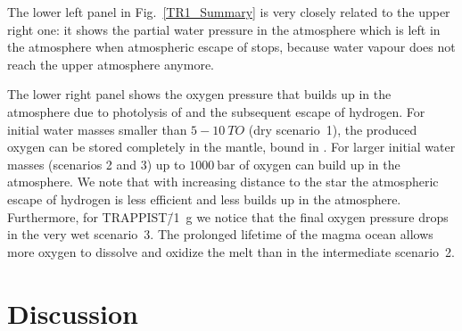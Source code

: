 \documentclass[paper=letterpaper,fontsize=12pt,oneside,twocolumn]{article}
\begin{document}
The lower left panel in  Fig.~\ref{TR1_Summary} is very closely related to the upper right one: it shows the partial water pressure in the atmosphere which is left in the atmosphere when atmospheric escape of  stops, because water vapour does not reach the upper atmosphere anymore.

The lower right panel shows the oxygen pressure that builds up in the atmosphere due to photolysis of  and the subsequent escape of hydrogen.
For initial water masses smaller than $5-\SI{10}{TO}$ (dry scenario~1), the produced oxygen can be stored completely in the mantle, bound in .
For larger initial water masses (scenarios 2 and 3) up to $\SI{1000}{\bar}$ of oxygen can build up in the atmosphere.
We note that with increasing distance to the star the atmospheric escape of hydrogen is less efficient and less  builds up in the atmosphere.
Furthermore, for TRAPPIST\=/1~g we notice that the final oxygen pressure drops in the very wet scenario~3.
The prolonged lifetime of the magma ocean allows more oxygen to dissolve and oxidize the melt than in the intermediate scenario~2. 

\section{Discussion}
\label{sec_discuss}
\end{document}
